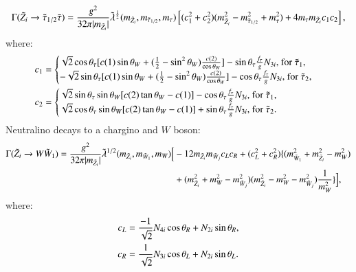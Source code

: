 \documentclass[final,3p,times]{elsarticle}
\begin{document}
\begin{equation} \label{neutstautauNMSSM}
\Gamma(\tilde{Z}_i \rightarrow \tilde{\tau}_{1/2} \bar{\tau}) = {g^2 \over 32\pi |m_{\tilde{Z}_i}|} \tilde{\lambda}^{1 \over 2}(m_{\tilde{Z}_i},m_{\tilde{\tau}_{1/2}}, m_{\tau})\left[(c_{1}^2 + c_{2}^2)(m_{\tilde{Z}_i}^2 - m_{\tilde{\tau}_{1/2}}^2 + m_{\tau}^2) + 4m_{\tau}m_{\tilde{Z}_i}c_{1}c_{2}\right],
\end{equation}
where:
\begin{align}
c_{1} &= \begin{cases}
		\sqrt{2}\cos\theta_{\tau}[c(1) \sin\theta_W + ({1 \over 2} - \sin^2 \theta_W){c(2) \over \cos\theta_W}] - \sin\theta_{\tau} {f_{\tau} \over g} N_{3i} $, for $\tilde{\tau}_1$,$ \\
		-\sqrt{2}\sin\theta_{\tau}[c(1) \sin\theta_W + ({1 \over 2} - \sin^2 \theta_W){c(2) \over \cos\theta_W}] - \cos\theta_{\tau} {f_{\tau} \over g}N_{3i} $, for $\tilde{\tau}_2$,$ \\
		\end{cases} \\
c_{2} &= \begin{cases}
		\sqrt{2}\sin\theta_{\tau}\sin\theta_W [c(2)\tan\theta_W - c(1)] - \cos\theta_{\tau} {f_{\tau} \over g} N_{3i} $, for $\tilde{\tau}_1$,$ \\
		\sqrt{2}\cos\theta_\tau \sin\theta_W [c(2)\tan\theta_W - c(1)] + \sin\theta_{\tau} {f_{\tau} \over g} N_{3i} $, for $\tilde{\tau}_2. \\
		\end{cases}
\end{align}
Neutralino decays to a chargino and $W$ boson:
\begin{equation} \label{neutWchNMSSM}
\begin{aligned}
\Gamma(\tilde{Z}_i \rightarrow W \tilde{W}_{1}) = {g^2 \over 32\pi |m_{\tilde{Z}_i}|} \tilde{\lambda}^{1/2}(m_{\tilde{Z}_i},m_{\tilde{W}_1},m_{W})\Big[& -12m_{\tilde{Z}_i} m_{\tilde{W}_j}c_{L}c_{R} + (c_{L}^2 + c_{R}^2)\{(m_{\tilde{W}_1}^2 + m_{\tilde{Z}_i}^2 - m_{W}^2) \\ & + (m_{\tilde{Z}_i}^2 + m_{W}^2 - m_{\tilde{W}_j}^2)(m_{\tilde{Z}_i}^2 - m_{W}^2 - m_{\tilde{W}_j}^2){1 \over m_{W}^2} \} \Big],
\end{aligned}
\end{equation}
where:
\begin{align}
c_{L} &= {-1 \over \sqrt{2}} N_{4i} \cos\theta_R + N_{2i}\sin\theta_R, \\  
c_{R} &= {1 \over \sqrt{2}} N_{3i} \cos\theta_L + N_{2i}\sin\theta_L.
\end{align}
\end{document}
